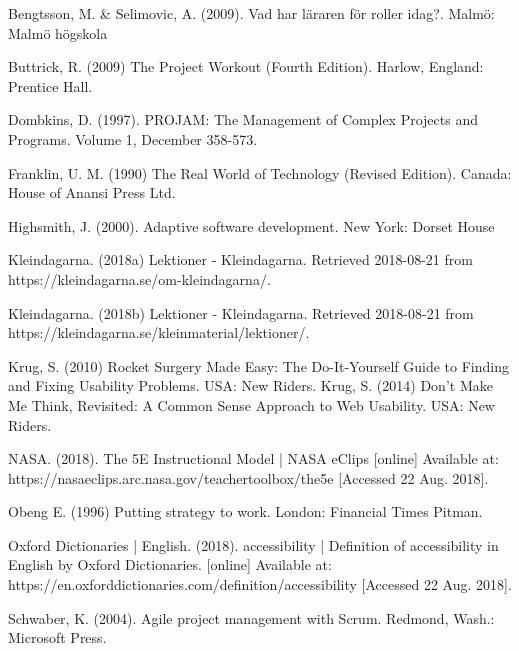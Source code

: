 \makeatletter
\renewcommand\@biblabel[1]{}
\makeatother

\begin{thebibliography}{69}

     Bengtsson, M. \& Selimovic, A. (2009). Vad har läraren för roller idag?. Malmö: Malmö högskola

     Buttrick, R. (2009) The Project Workout (Fourth Edition). Harlow, England: Prentice Hall.
 
     Dombkins, D. (1997). PROJAM: The Management of Complex Projects and Programs. Volume 1, December 358-573.
  
     Franklin, U. M. (1990) The Real World of Technology (Revised Edition). Canada: House of Anansi Press Ltd.
  
     Highsmith, J. (2000). Adaptive software development. New York: Dorset House
  
     Kleindagarna. (2018a) Lektioner - Kleindagarna. Retrieved 2018-08-21 from https://kleindagarna.se/om-kleindagarna/.
  
     Kleindagarna. (2018b) Lektioner - Kleindagarna. Retrieved 2018-08-21 from https://kleindagarna.se/kleinmaterial/lektioner/.
  
     Krug, S. (2010) Rocket Surgery Made Easy: The Do-It-Yourself Guide to Finding and Fixing Usability Problems. USA: New Riders.
     Krug, S. (2014) Don't Make Me Think, Revisited: A Common Sense Approach to Web Usability. USA: New Riders.
    
     NASA. (2018). The 5E Instructional Model | NASA eClips [online] Available at: https://nasaeclips.arc.nasa.gov/teachertoolbox/the5e [Accessed 22 Aug. 2018].

     Obeng E. (1996) Putting strategy to work. London: Financial Times Pitman.

     Oxford Dictionaries | English. (2018). accessibility | Definition of accessibility in English by Oxford Dictionaries. [online] Available at: https://en.oxforddictionaries.com/definition/accessibility [Accessed 22 Aug. 2018].
  
     Schwaber, K. (2004). Agile project management with Scrum. Redmond, Wash.: Microsoft Press.
    

\end{thebibliography}
